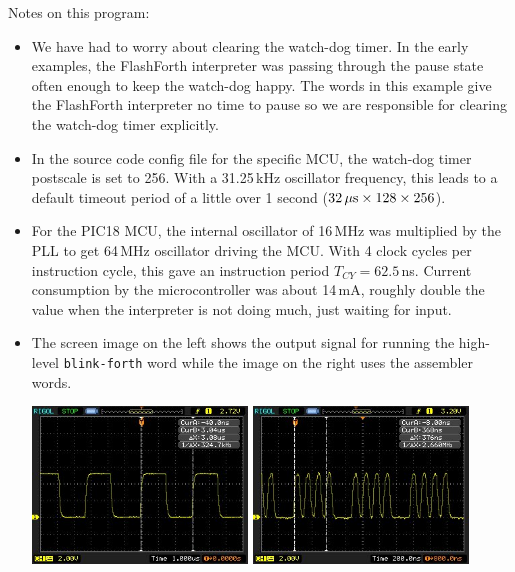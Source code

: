 \documentclass[12pt,a4paper]{article}
\newcommand{\code}[2]{
 \hrulefill
 \scriptsize
 
 \hrulefill
 \vspace{2em}
 \normalsize
}
\begin{document}
\bigskip\noindent
\code{}{../pic18/speed-test.txt}

\noindent
Notes on this program:
\begin{itemize}
 \item We have had to worry about clearing the watch-dog timer.
  In the early examples, the FlashForth interpreter was 
  passing through the pause state often enough to keep the watch-dog happy.
  The words in this example give the FlashForth interpreter no time to pause
  so we are responsible for clearing the watch-dog timer explicitly.
 \item In the source code config file for the specific MCU, the watch-dog timer postscale
  is set to 256.
  With a 31.25\,kHz oscillator frequency, this leads to a default timeout period
  of a little over 1 second ($32\,\mu{\rm s} \times 128 \times 256$).
 \item For the PIC18 MCU, the internal oscillator of 16\,MHz was multiplied by the PLL
   to get 64\,MHz oscillator driving the MCU.  
   With 4 clock cycles per instruction cycle, this gave an instruction period $T_{CY}=62.5$\,ns.
   Current consumption by the microcontroller was about 14\,mA, roughly double the value
   when the interpreter is not doing much, just waiting for input.
 \item The screen image on the left shows the output signal for running the high-level
  \verb!blink-forth! word while the image on the right uses the assembler words.
  \begin{center}
  \includegraphics[width=0.45\textwidth]{../figs/speed-test-forth-pic18f26k22.jpeg}
  \includegraphics[width=0.45\textwidth]{../figs/speed-test-asm-pic18f26k22.jpeg}

\end{center}
\end{itemize}
\end{document}
